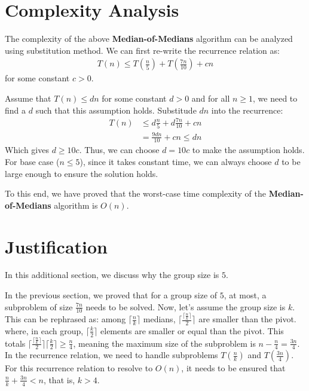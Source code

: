 \documentclass[11pt, a4paper, oneside]{memoir}
\begin{document}
\section{Complexity Analysis}
The complexity of the above \textbf{Median-of-Medians} algorithm can be analyzed using substitution method.
We can first re-write the recurrence relation as:
\begin{align*}
    T(n) \leq T(\frac{n}{5}) + T(\frac{7n}{10}) + cn
\end{align*}
for some constant $c > 0$.

Assume that $T(n) \leq dn$ for some constant $d > 0$ and for all $n \geq 1$, we need to find a $d$ such that this assumption holds.
Substitude $dn$ into the recurrence:
\begin{align*}
    T(n) &\leq d\frac{n}{5} + d\frac{7n}{10} + cn \\
    &= \frac{9dn}{10} + cn \leq dn
\end{align*}
Which gives $d \geq 10c$. Thus, we can choose $d = 10c$ to make the assumption holds.
For base case ($n \leq 5$), since it takes constant time, we can always choose $d$ to be large enough to ensure the solution holds.

To this end, we have proved that the worst-case time complexity of the \textbf{Median-of-Medians} algorithm is $O(n)$.

\section*{Justification}
\label{just}
In this additional section, we discuss why the group size is $5$.

In the previous section, we proved that for a group size of $5$, at most, a subproblem of size $\frac{7n}{10}$ needs to be solved.
Now, let's assume the group size is $k$.
This can be rephrased as: among $\lceil \frac{n}{k} \rceil$ medians, $\lceil \frac{\lceil \frac{n}{k} \rceil}{2} \rceil$ are smaller than the pivot.
where, in each group, $\lceil \frac{k}{2} \rceil$ elements are smaller or equal than the pivot. This totals $\lceil \frac{\lceil \frac{n}{k} \rceil}{2} \rceil \lceil \frac{k}{2} \rceil \geq \frac{n}{4}$\footnotemark,
meaning the maximum size of the subproblem is $n-\frac{n}{4}=\frac{3n}{4}$.
In the recurrence relation, we need to handle subproblems $T(\frac{n}{k})$ and $T(\frac{3n}{4})$.
For this recurrence relation to resolve to $O(n)$, it needs to be ensured that $\frac{n}{k}+\frac{3n}{4} < n$, that is, $k > 4$.

\end{document}
